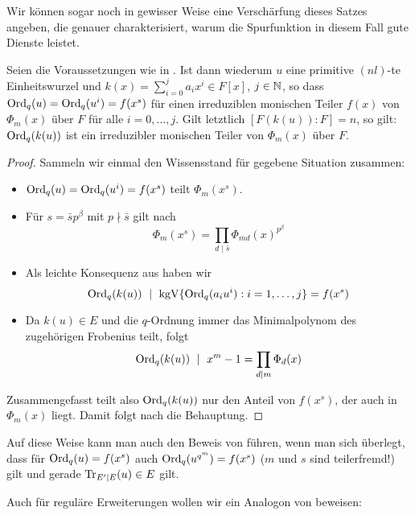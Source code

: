 Wir können sogar noch in gewisser Weise eine Verschärfung dieses Satzes
angeben, die genauer charakterisiert, warum die Spurfunktion in diesem Fall
gute Dienste leistet.

\begin{satz}
  \label{satz:q_ordnung_von_zusammensetzen}
  Seien die Voraussetzungen wie in .
  Ist dann wiederum $u$ eine primitive $(nl)$-te Einheitswurzel und
  $k(x) = \sum_{i=0}^j a_i x^i \in F[x]$, $j\in\mathbb{N}$, so dass
  $\operatorname{Ord}_q(u) = \operatorname{Ord}_q(u^i) = f(x^s)$ für einen irreduziblen monischen Teiler 
  $f(x)$ von $\Phi_m(x)$ über $F$ für alle $i=0,\ldots,j$. Gilt letztlich
  $[F(k(u)):F]=n$, so gilt:
  $\operatorname{Ord}_q(k(u))$ ist ein irreduzibler monischen Teiler 
  von $\Phi_m(x)$ über $F$.
\end{satz}
\begin{proof}
  Sammeln wir einmal den Wissensstand für gegebene Situation zusammen:
  \begin{itemize}
    \item $\operatorname{Ord}_q(u) = \operatorname{Ord}_q(u^i) = f(x^s)$ teilt $\Phi_m(x^s)$.
    \item Für $s = \bar s p^\beta$ mit $p\nmid \bar s$ gilt nach
      \[\Phi_m(x^s) = \prod_{d\mid \bar s} \Phi_{md}(x)^{p^\beta}\]
    \item Als leichte Konsequenz aus 
       haben wir 
      \[\operatorname{Ord}_q(k(u)) \ \mid\  \operatorname{kgV}\{\operatorname{Ord}_q(a_iu^i): i=1,\ldots,j\} = f(x^s) \]
    \item Da $k(u)\in E$ und die $q$-Ordnung immer das Minimalpolynom 
      des zugehörigen Frobenius teilt, folgt
      \[\operatorname{Ord}_q(k(u)) \ \mid\  x^m-1 = \prod_{d\mid m} \Phi_d(x)\]
  \end{itemize}
  Zusammengefasst teilt also $\operatorname{Ord}_q(k(u))$ nur den Anteil von $f(x^s)$,
  der auch in $\Phi_m(x)$ liegt. Damit folgt nach
   die Behauptung.
\end{proof}

\begin{bemerkung}
  Auf diese Weise kann man auch den Beweis von 
  führen, wenn man sich überlegt, dass für $\operatorname{Ord}_q(u) = f(x^s)$ auch
  $\operatorname{Ord}_q(u^{q^m}) = f(x^s)$ ($m$ und $s$ sind teilerfremd!) 
  gilt und gerade $\operatorname{Tr}_{E'\mid E}(u) \in E$ gilt.
\end{bemerkung}


Auch für reguläre Erweiterungen wollen wir ein Analogon von 
 beweisen:

